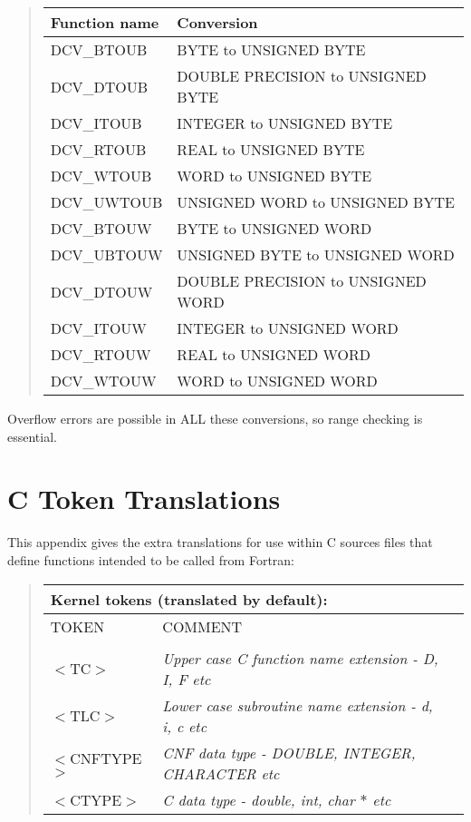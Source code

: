 \documentclass[twoside,11pt,nolof]{starlink}
\begin{document}
\begin{quote}
\begin{tabular}{ll}
\textbf{Function name}     &\textbf{Conversion}\\
\hline
DCV\_BTOUB  &BYTE to UNSIGNED BYTE \\
DCV\_DTOUB  &DOUBLE PRECISION to UNSIGNED BYTE \\
DCV\_ITOUB  &INTEGER to UNSIGNED BYTE \\
DCV\_RTOUB  &REAL to UNSIGNED BYTE \\
DCV\_WTOUB  &WORD to UNSIGNED BYTE \\
DCV\_UWTOUB &UNSIGNED WORD to UNSIGNED BYTE \\
DCV\_BTOUW  &BYTE to UNSIGNED WORD \\
DCV\_UBTOUW &UNSIGNED BYTE to UNSIGNED WORD \\
DCV\_DTOUW  &DOUBLE PRECISION to UNSIGNED WORD \\
DCV\_ITOUW  &INTEGER to UNSIGNED WORD \\
DCV\_RTOUW  &REAL to UNSIGNED WORD \\
DCV\_WTOUW  &WORD to UNSIGNED WORD \\
\end{tabular}
\end{quote}

Overflow errors are possible in ALL these conversions, so range checking is
essential.

\appendix
\newpage
\section{C Token Translations\label{ap_c}}

This appendix gives the extra translations for use within C sources files
that define functions intended to be called from Fortran:

\begin{quote}
\begin{tabular}{lll}
\multicolumn{3}{l}{\bf{Kernel} tokens (translated by default):}\\
\hline
TOKEN          &COMMENT\\
\\
$<$TC$>$       &\emph{Upper case C function name extension - D, I, F etc}\\
$<$TLC$>$      &\emph{Lower case subroutine name extension - d, i, c etc}\\
$<$CNFTYPE$>$  &\emph{CNF data type - DOUBLE, INTEGER, CHARACTER etc}\\
$<$CTYPE$>$    &\emph{C data type - double, int, char $*$ etc}\\
\end{tabular}

\end{quote}
\end{document}

